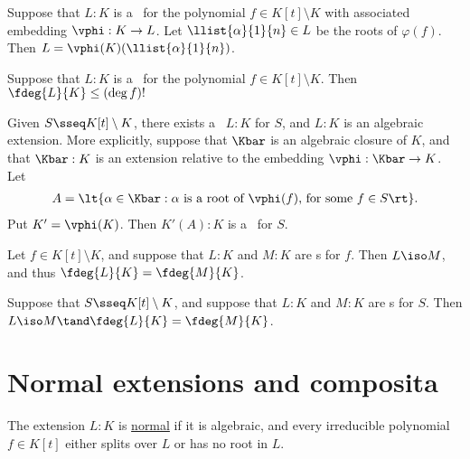 \documentclass{article}
\begin{document}
  \begin{tproposition}
    Suppose that \( L:K \) is a \sfe~for the polynomial \( f\in K[t]\setminus K \) with associated embedding \( \vphi:K\to L \).
    Let \( \llist{\alpha}{1}{n}\in L \) be the roots of \( \varphi(f) \).
    Then \( L=\vphi(K)(\llist{\alpha}{1}{n}) \).
  \end{tproposition}

  \begin{tproposition}
    Suppose that \( L:K \) is a \sfe~for the polynomial \( f\in K[t]\setminus K \).
    Then \( \fdeg{L}{K}\leq (\deg f)! \)
  \end{tproposition}

  \begin{tproposition}
    Given \( S\sseq K[t]\setminus K \), there exists a \sfe~\( L:K \) for \( S \), and \( L:K \) is an algebraic extension.
    More explicitly, suppose that \( \Kbar \) is an algebraic closure of \( K \), and that \( \Kbar:K \) is an extension relative to the embedding \( \vphi:\Kbar\to K \).
    Let
    \begin{align*}
      A=\lt\{ \alpha\in \Kbar : \alpha\text{ is a root of \( \vphi(f) \), for some } f\in S \rt\}.
    \end{align*}
    Put \( K'=\vphi(K) \).
    Then \( K'(A):K \) is a \sfe~for \( S \).
  \end{tproposition}

  \begin{ttheorem}
    Let \( f\in K[t]\setminus K \), and suppose that \( L:K \) and \( M:K \) are \sfe s for \( f \).
    Then \( L\iso M \), and thus \( \fdeg{L}{K}=\fdeg{M}{K} \).
  \end{ttheorem}

  \begin{ttheorem}
    Suppose that \( S\sseq K[t]\setminus K \), and suppose that \( L:K \) and \( M:K \) are \sfe s for \( S \).
    Then \( L\iso M\tand \fdeg{L}{K}=\fdeg{M}{K} \).
  \end{ttheorem}

\section{Normal extensions and composita}
  \begin{tdefinition}
    The extension \( L:K \) is \ul{normal} if it is algebraic, and every irreducible polynomial \( f\in K[t] \) either splits over \( L \) or has no root in \( L \).
  \end{tdefinition}
\end{document}
